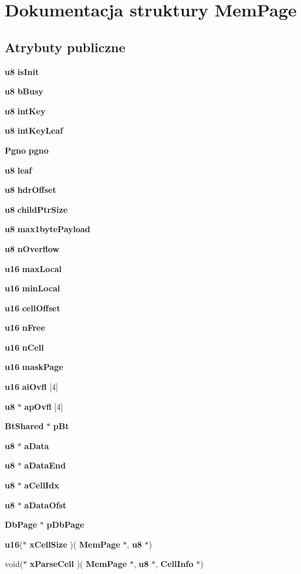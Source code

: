 \section{Dokumentacja struktury Mem\+Page}
\label{struct_mem_page}
\subsection*{Atrybuty publiczne}
\begin{DoxyCompactItemize}
\item 
\textbf{ u8} \textbf{ is\+Init}
\item 
\textbf{ u8} \textbf{ b\+Busy}
\item 
\textbf{ u8} \textbf{ int\+Key}
\item 
\textbf{ u8} \textbf{ int\+Key\+Leaf}
\item 
\textbf{ Pgno} \textbf{ pgno}
\item 
\textbf{ u8} \textbf{ leaf}
\item 
\textbf{ u8} \textbf{ hdr\+Offset}
\item 
\textbf{ u8} \textbf{ child\+Ptr\+Size}
\item 
\textbf{ u8} \textbf{ max1byte\+Payload}
\item 
\textbf{ u8} \textbf{ n\+Overflow}
\item 
\textbf{ u16} \textbf{ max\+Local}
\item 
\textbf{ u16} \textbf{ min\+Local}
\item 
\textbf{ u16} \textbf{ cell\+Offset}
\item 
\textbf{ u16} \textbf{ n\+Free}
\item 
\textbf{ u16} \textbf{ n\+Cell}
\item 
\textbf{ u16} \textbf{ mask\+Page}
\item 
\textbf{ u16} \textbf{ ai\+Ovfl} [4]
\item 
\textbf{ u8} $\ast$ \textbf{ ap\+Ovfl} [4]
\item 
\textbf{ Bt\+Shared} $\ast$ \textbf{ p\+Bt}
\item 
\textbf{ u8} $\ast$ \textbf{ a\+Data}
\item 
\textbf{ u8} $\ast$ \textbf{ a\+Data\+End}
\item 
\textbf{ u8} $\ast$ \textbf{ a\+Cell\+Idx}
\item 
\textbf{ u8} $\ast$ \textbf{ a\+Data\+Ofst}
\item 
\textbf{ Db\+Page} $\ast$ \textbf{ p\+Db\+Page}
\item 
\textbf{ u16}($\ast$ \textbf{ x\+Cell\+Size} )(\textbf{ Mem\+Page} $\ast$, \textbf{ u8} $\ast$)
\item 
void($\ast$ \textbf{ x\+Parse\+Cell} )(\textbf{ Mem\+Page} $\ast$, \textbf{ u8} $\ast$, \textbf{ Cell\+Info} $\ast$)
\end{DoxyCompactItemize}


